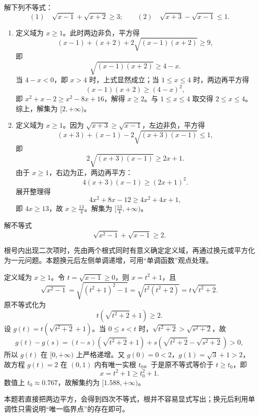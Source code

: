 \begin{example}
  解下列不等式：
  \[
  (1)\quad \sqrt{x-1}+\sqrt{x+2}\ge 3;\qquad
  (2)\quad \sqrt{x+3}-\sqrt{x-1}\le 1.
  \]
\end{example}
\begin{jie}
  \begin{enumerate}
    \item 定义域为 \(x\ge 1\)。此时两边非负，平方得
    \[
    (x-1)+(x+2)+2\sqrt{(x-1)(x+2)}\ge 9,
    \]
    即
    \[
    \sqrt{(x-1)(x+2)}\ge 4-x.
    \]
    当 \(4-x<0\)，即 \(x>4\) 时，上式显然成立；当 \(1\le x\le 4\) 时，两边再平方得
    \[
    (x-1)(x+2)\ge (4-x)^2,
    \]
    即 \(x^2+x-2\ge x^2-8x+16\)，解得 \(x\ge 2\)。与 \(1\le x\le 4\) 取交得 \(2\le x\le 4\)。
    综上，解集为 \([2,+\infty)\)。
    \item 定义域为 \(x\ge 1\)。因为 \(\sqrt{x+3}\ge \sqrt{x-1}\)，左边非负，平方得
    \[
    (x+3)+(x-1)-2\sqrt{(x+3)(x-1)}\le 1,
    \]
    即
    \[
    2\sqrt{(x+3)(x-1)}\ge 2x+1.
    \]
    由于 \(x\ge 1\)，右边为正，两边再平方：
    \[
    4(x+3)(x-1)\ge (2x+1)^2.
    \]
    展开整理得
    \[
    4x^2+8x-12\ge 4x^2+4x+1,
    \]
    即 \(4x\ge 13\)，故 \(x\ge \frac{13}{4}\)。解集为 \([\frac{13}{4},+\infty)\)。
  \end{enumerate}
\end{jie}

\begin{example}
  解不等式
  \[
  \sqrt{x^2-1}+\sqrt{x-1}\ge 2.
  \]
\end{example}
\begin{analyse}
  根号内出现二次项时，先由两个根式同时有意义确定定义域，再通过换元或平方化为一元问题。本题换元后左侧单调递增，可用“单调函数”观点处理。
\end{analyse}
\begin{jie}
  定义域为 \(x\ge 1\)。令 \(t=\sqrt{x-1}\ge 0\)，则 \(x=t^2+1\)，且
  \[
  \sqrt{x^2-1}=\sqrt{(t^2+1)^2-1}=\sqrt{t^2(t^2+2)}=t\sqrt{t^2+2}.
  \]
  原不等式化为
  \[
  t(\sqrt{t^2+2}+1)\ge 2.
  \]
  设 \(g(t)=t(\sqrt{t^2+2}+1)\)。当 \(0\le s<t\) 时，\(\sqrt{t^2+2}>\sqrt{s^2+2}\)，故
  \[
  g(t)-g(s)=(t-s)(\sqrt{t^2+2}+1)+s(\sqrt{t^2+2}-\sqrt{s^2+2})>0,
  \]
  所以 \(g(t)\) 在 \([0,+\infty)\) 上严格递增。又 \(g(0)=0<2\)，\(g(1)=\sqrt3+1>2\)，故方程 \(g(t)=2\) 在 \((0,1)\) 内有唯一实根 \(t_0\)。于是原不等式等价于 \(t\ge t_0\)，即
  \[
  x=t^2+1\ge t_0^2+1.
  \]
  数值上 \(t_0\approx0.767\)，故解集约为 \([1.588,+\infty)\)。
\end{jie}
\begin{zhu}
  本题若直接把两边平方，会得到四次不等式，根并不容易显式写出；换元后利用单调性只需说明“唯一临界点”的存在即可。
\end{zhu}

